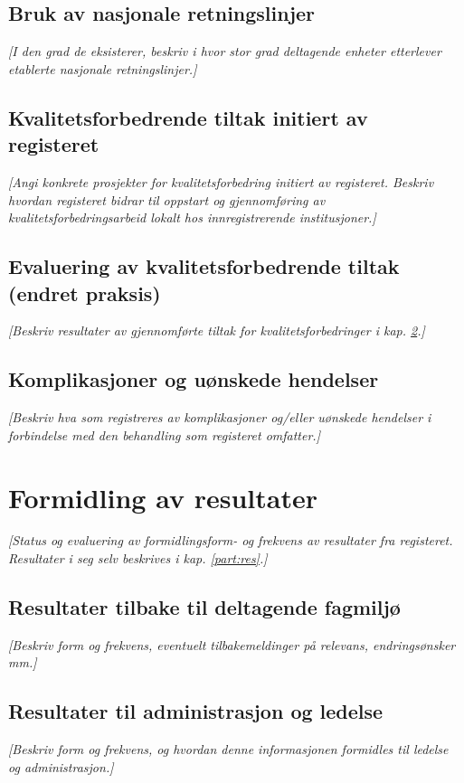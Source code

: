 \documentclass[norsk, a4paper, twocolumn]{report}
\newcommand{\guide}[1] {
	\textit{[\textcolor{guidegray}{#1}]}
	}
\begin{document}
\section{Bruk av nasjonale retningslinjer}\label{sec:retbru}
\guide{I den grad de eksisterer, beskriv i hvor stor grad deltagende enheter
etterlever etablerte nasjonale retningslinjer.}


\section{Kvalitetsforbedrende tiltak initiert av registeret}\label{sec:brures}
\guide{Angi konkrete prosjekter
for kvalitetsforbedring initiert av registeret. Beskriv
hvordan registeret bidrar til oppstart og gjennomføring
av kvalitetsforbedringsarbeid lokalt hos innregistrerende institusjoner.}

\section{Evaluering av kvalitetsforbedrende tiltak (endret praksis)}\label{sec:evakva}
\guide{Beskriv resultater av gjennomførte tiltak for kvalitetsforbedringer
i kap. \ref{sec:brures}.}

\section{Komplikasjoner og uønskede hendelser}\label{sec:kom}
\guide{Beskriv hva som registreres av komplikasjoner og/eller uønskede
hendelser i forbindelse med den behandling som registeret omfatter.}




\chapter{Formidling av resultater}\label{cha:dat}
\guide{Status og evaluering av formidlingsform- og frekvens
av resultater fra registeret.
Resultater i seg selv beskrives i kap. \ref{part:res}.}


\section{Resultater tilbake til deltagende fagmiljø}\label{sec:resfag}
\guide{Beskriv form og frekvens,  eventuelt tilbakemeldinger på relevans,
endringsønsker mm.}

\section{Resultater til administrasjon og ledelse}\label{sec:resled}
\guide{Beskriv form og frekvens, og hvordan denne
informasjonen formidles til ledelse og administrasjon.}
\end{document}
